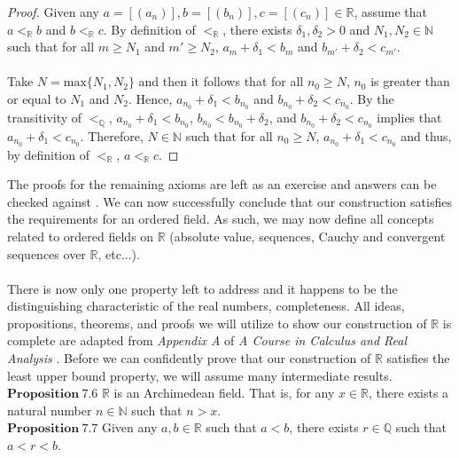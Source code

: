 \documentclass[12pt]{article}
\theoremstyle{definition}
\theoremstyle{remark}
\begin{document}
	\begin{proof} Given any $a=[(a_n)],b=[(b_n)],c=[(c_n)]\in\mathbb{R}$, assume that $a<_\mathbb{R}b$ and $b<_\mathbb{R}c$. By definition of $<_\mathbb{R}$, there exists $\delta_1,\delta_2>0$ and $N_1,N_2\in\mathbb{N}$ such that for all $m\geq N_1$ and $m'\geq N_2$, $a_{m}+\delta_1<b_{m}$ and $b_{m'}+\delta_2<c_{m'}$.\\\\
 Take $N=\text{max}\{N_1,N_2\}$ and then it follows that for all $n_0\geq N$, $n_0$ is greater than or equal to $N_1$ and $N_2$. Hence, $a_{n_0}+\delta_1<b_{n_0}$ and $b_{n_0}+\delta_2<c_{n_0}$. By the transitivity of $<_\mathbb{Q}$, $a_{n_0} +\delta_1 <b_{n_0}$, $b_{n_0}<b_{n_0}+\delta_2$, and $b_{n_0}+\delta_2<c_{n_0}$ implies that $a_{n_0}+\delta_1< c_{n_0}$. Therefore, $N\in\mathbb{N}$ such that for all $n_0\geq N$, $a_{n_0}+\delta_1<c_{n_0}$ and thus, by definition of $<_\mathbb{R}$, $a<_\mathbb{R}c$.
	\end{proof}
 
 \noindent The proofs for the remaining axioms are left as an exercise and answers can be checked against \cite[pg.20-21]{approaches}. We can now successfully conclude that our construction satisfies the requirements for an ordered field. As such, we may now define all concepts related to ordered fields on $\mathbb{R}$ (absolute value, sequences, Cauchy and convergent sequences over $\mathbb{R}$, etc...).\\\\
 There is now only one property left to address and it happens to be the distinguishing characteristic of the real numbers, completeness. All ideas, propositions, theorems, and proofs we will utilize to show our construction of $\mathbb{R}$ is complete are adapted from \textit{Appendix A} of \textit{A Course in Calculus and Real Analysis} \cite[p.505-512]{new}. Before we can confidently prove that our construction of $\mathbb{R}$ satisfies the least upper bound property, we will assume many intermediate results.\\
 
\noindent $\mathbf{Proposition\ 7.6}$ $\mathbb{R}$ is an Archimedean field. That is, for any $x\in\mathbb{R}$, there exists a natural number $n\in\mathbb{N}$ such that $n>x$.\\

\noindent $\mathbf{Proposition\ 7.7}$ Given any $a,b\in\mathbb{R}$ such that $a<b$, there exists $r\in\mathbb{Q}$ such that $a<r<b$.\\
\end{document}
